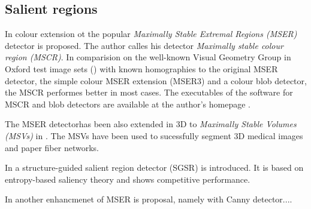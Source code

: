 \subsection{Salient regions}

In \cite{Forssen07} colour extension ot the popular {\em  Maximally Stable Extremal Regions (MSER)} detector is proposed. The author calles his detector {\em Maximally stable colour region (MSCR)}. In comparision on the well-known Visual Geometry Group in Oxford test image sets (\cite{vgg_soft_data}) with known homographies to the original MSER detector, the simple colour MSER extension (MSER3) and a colour blob detector, the MSCR performes better in most cases. The executables of the software for MSCR and blob detectors are available at the author's homepage \cite{forssen07_soft}.

The MSER detectorhas been also extended in 3D to {\em Maximally Stable Volumes (MSVs)} in \cite{DonoserB06}. The MSVs have been used to sucessfully segment 3D medical images and paper fiber networks.

In \cite{Fan08} a structure-guided salient region detector (SGSR) is introduced. It is based on entropy-based saliency theory and shows competitive performance.

In \cite{Wang14} another enhancmenet of MSER is proposal, namely with Canny detector....